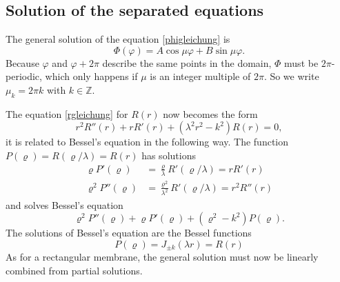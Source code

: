 \subsection{Solution of the separated equations}
The general solution of the equation \eqref{phigleichung} is
\[
\Phi(\varphi)=A\cos\mu\varphi +B\sin\mu\varphi.
\]
Because $\varphi$ and $\varphi+2\pi$ describe the same points in the domain,
$\Phi$ must be $2\pi$-periodic, which only happens if
$\mu$ is an integer multiple of $2\pi$.
So we write $\mu_k = 2\pi k$ with $k\in\mathbb Z$.

The equation \eqref{rgleichung} for $R(r)$ now becomes the form
\[
r^2R''(r)+rR'(r)+(\lambda^2 r^2-k^2)R(r)=0,
\]
it is related to Bessel's equation in the following way.
The function
$P(\varrho)=R(\varrho/\lambda)=R(r)$ has solutions
\begin{align*}
\varrho P'(\varrho)&=\frac{\varrho}{\lambda}R'(\varrho/\lambda)=rR'(r)\\
\varrho^2 P''(\varrho)&=\frac{\varrho^2}{\lambda^2}R'(\varrho/\lambda)=r^2R''(r)
\end{align*}
and solves Bessel's equation
\[
\varrho^2P''(\varrho)+\varrho P'(\varrho)+(\varrho^2-k^2)P(\varrho).
\]
The solutions of Bessel's equation are the Bessel functions
\[
P(\varrho)=J_{\pm k}(\lambda r)=R(r)
\]
As for a rectangular membrane, the general solution must now be
linearly combined from partial solutions.

